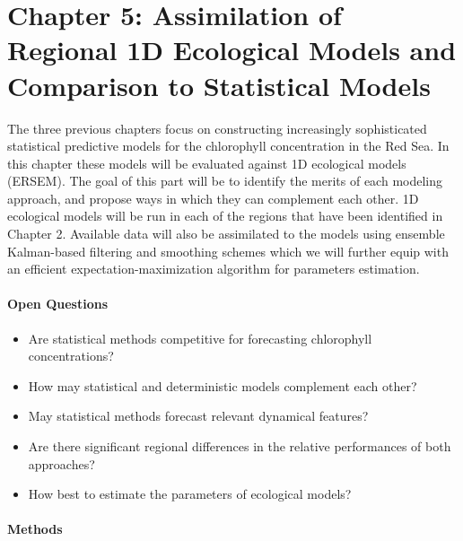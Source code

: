 \section{Chapter 5: Assimilation of Regional 1D Ecological Models and
Comparison to Statistical Models}

The three previous chapters focus on constructing increasingly sophisticated
statistical predictive models for the chlorophyll concentration in the Red Sea.
In this chapter these models will be evaluated against 1D ecological models
(ERSEM). The goal of this part will be to identify the merits of each modeling
approach, and propose ways in which they can complement each other. 1D
ecological models will be run in each of the regions that have been identified
in Chapter 2.  Available data will also be assimilated to the models using
ensemble Kalman-based filtering and smoothing schemes which we will further
equip with an efficient expectation-maximization algorithm for parameters
estimation.

\paragraph{Open Questions}

\begin{itemize}

\item Are statistical methods competitive for forecasting chlorophyll
concentrations?

\item How may statistical and deterministic models complement each other?

\item May statistical methods forecast relevant dynamical features?

\item Are there significant regional differences in the relative performances
of both approaches?

\item How best to estimate the parameters of ecological models? 

\end{itemize}

\paragraph{Methods}

